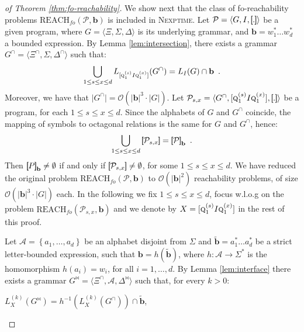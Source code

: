 \documentclass[final]{llncs}
\newcommand{\rbr}{{\bf ]\!\!]}}
\newcommand{\lbr}{{\bf [\!\![}}
\newcommand{\sem}[1]{\lbr #1 \rbr}
\def\set#1{{\left\{ #1 \right\}}}
\def\tuple#1{{\langle #1 \rangle}}
\def\len#1{{\vert{#1}\vert}}
\def\prod{\Delta}
\def\pat{{\mathbf{b}}}
\def\patt{{\widetilde{\mathbf{b}}}}
\def\Vars{\ensuremath{\Xi}}
\def\foreach{\mathrm{REACH}_{\mathit{fo}}}
\begin{document}
\begin{proof}[of Theorem \ref{thm:fo-reachability}]
  We show next that the class of fo-reachability
  problems \(\foreach(\mathcal{P}, \pat)\) is included
  in \textsc{Nexptime}. Let \(\mathcal{P} = \tuple{G,I,\sem{.}}\) be a
  given program, where \(G=\tuple{\Vars,\Sigma,\prod}\) is its
  underlying grammar, and \(\pat = w_1^* \ldots w_d^*\) a bounded
  expression. By Lemma \ref{lem:intersection}, there exists a
  grammar \(G^\cap = \tuple{\Vars^\cap,\Sigma,\prod^\cap}\) such
  that: \[\bigcup_{1\leq s\leq x\leq d} L_{[\textsc{q}^{(s)}_1
  I \textsc{q}^{(x)}_{1}]}(G^{\cap}) = L_I(G) \cap \pat\enspace.\]
  Moreover, we have that $\len{G^\cap}
  = \mathcal{O}(\len{\pat}^3 \cdot \len{G})$.
  Let \(\mathcal{P}_{s,x}=\tuple{G^\cap, [\textsc{q}^{(s)}_1
  I \textsc{q}^{(x)}_{1}], \sem{.}}\) be a program, for each \(1 \leq
  s \leq x \leq d\). Since the alphabets of \(G\) and \(G^\cap\)
  coincide, the mapping of symbols to octagonal relations is the same
  for \(G\) and \(G^\cap\), hence: \[\bigcup_{1\leq s\leq x\leq
  d} \sem{\mathcal{P}_{s,x}} = \sem{\mathcal{P}}_\pat\enspace.\]
  Then \(\sem{P}_\pat \neq \emptyset\) if and only
  if \(\sem{\mathcal{P}_{s,x}} \neq \emptyset\), for some \(1 \leq
  s \leq x \leq d\). We have reduced the original
  problem \(\foreach(\mathcal{P},\pat)\)
  to \(\mathcal{O}(\len{\pat}^2)\) reachability problems, of
  size \(\mathcal{O}(\len{\pat}^3 \cdot \len{G})\) each. In the
  following we fix \(1 \leq s \leq x \leq d\), focus w.l.o.g on the
  problem \(\foreach(\mathcal{P}_{s,x},\pat)\) and we denote by \(X =
  [\textsc{q}^{(s)}_1 I \textsc{q}^{(x)}_{1}]\) in the rest of this
  proof.

  Let \(\mathcal{A} = \set{a_1,\ldots,a_d}\) be an alphabet disjoint
  from \(\Sigma\) and \(\patt=a_1^* \ldots a_d^*\) be a strict
  letter-bounded expression, such that \(\pat=h(\patt)\),
  where \(h: \mathcal{A} \rightarrow \Sigma^*\) is the
  homomorphism \(h(a_i) = w_i\), for all \(i=1,\ldots,d\). By
  Lemma \ref{lem:interface} there exists a
  grammar \(G^\bowtie=\tuple{\Vars^\cap, \mathcal{A}, \prod^\bowtie}\)
  such that, for every \(k >
  0\): \begin{compactenum} 

  \item \(L_X^{(k)}(G^{\bowtie}) =
        h^{-1}(L_X^{(k)}(G^\cap)) \cap \patt\),


\end{compactenum}
\end{proof}
\end{document}
